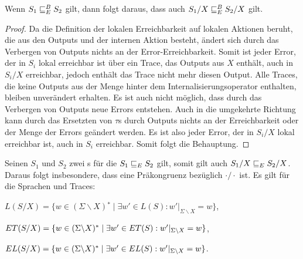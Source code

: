 \begin{prop}
\label{propErBaIn}
  Wenn $S_1\sqsubseteq _E^B S_2$ gilt, dann folgt daraus, dass auch $S_1/X\sqsubseteq _E^B S_2/X$
  gilt.
\end{prop}

\begin{proof}
  Da die Definition der lokalen Erreichbarkeit auf lokalen Aktionen beruht, die
  aus den Outputs und der internen Aktion besteht, ändert sich durch das
  Verbergen von Outputs nichts an der Error-Erreichbarkeit. Somit ist jeder
  Error, der in $S_i$ lokal erreichbar ist über ein Trace, das Outputs aus $X$
  enthält, auch in $S_i/X$ erreichbar, jedoch enthält das Trace
  nicht mehr diesen Output. Alle Traces, die keine Outputs aus der Menge hinter
  dem Internalisierungsoperator enthalten, bleiben unverändert erhalten. Es ist
  auch nicht möglich, dass durch das Verbergen von Outputs neue Errors
  entstehen. Auch in die umgekehrte Richtung kann durch das Ersetzten von
  $\tau$s durch Outputs nichts an der Erreichbarkeit oder der Menge der Errors
  geändert werden. Es ist also jeder Error, der in $S_i/X$ lokal erreichbar
  ist, auch in $S_i$ erreichbar. Somit folgt die Behauptung.
\end{proof}

\begin{satz}
\label{satzPraeInternalisierung}
  Seinen $S_1$ und $S_2$ zwei \EIO{}s für die $S_1\sqsubseteq _E S_2$ gilt, somit gilt
  auch $S_1/X\sqsubseteq _E S_2/X$. Daraus folgt insbesondere, dass \ERel{} eine
  Präkongruenz bezüglich $\cdot /\cdot$ ist.
  Es gilt für die Sprachen und Traces:
  \begin{compactenum}[(i)]
  \item $L(S/X) = \{w\in (\Sigma\backslash X){}^*\mid \exists w'\in L(S):
      w'|_{\Sigma\backslash X} = w\}$,
    \item $ET{}(S/X) = \{w\in (\Sigma\backslash X){}^*\mid \exists
      w'\in ET{}(S): w'|_{\Sigma\backslash X} = w\}$,
    \item $EL{}(S/X) = \{w\in (\Sigma\backslash X){}^*\mid \exists w'\in
      EL(S): w'|_{\Sigma\backslash X} = w\}$.
  \end{compactenum}
\end{satz}

